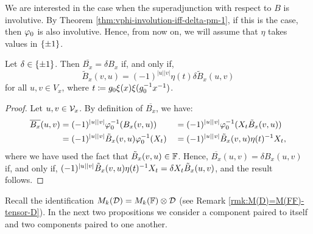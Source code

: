 We are interested in the case when the superadjunction with respect to $B$ is involutive.
By Theorem \ref{thm:vphi-involution-iff-delta-pm-1}, if this is the case, then $\varphi_0$ is also involutive. 
Hence, from now on, we will assume that $\eta$ takes values in $\{ \pm 1 \}$.

\begin{lemma}\label{lemma:B_x-delta}
	Let $\delta \in \{ \pm 1 \}$.
	Then $\overline{B_x} = \delta B_x$ if, and only if,
	\[
		\tilde{B}_x (v, u) = (-1)^{|u| |v|} \eta(t) \delta \tilde{B}_x (u, v)
	\]
	for all $u, v \in V_x$, where $t \coloneqq g_0 \xi(x) \xi(g_0^{-1} x^{-1})$.
\end{lemma}

\begin{proof}
	Let $u,v \in \mathcal V_x$.
	By definition of $\overline{B_x}$, we have:
	\begin{alignat*}{3}
		\overline{B_x} (u, v) & = (-1)^{|u||v|} \varphi_0^{-1}( B_x(v, u) )
		                      &                                                  & = (-1)^{|u||v|} \varphi_0^{-1}( X_t \tilde{B}_x(v, u) ) \\
		                      & = (-1)^{|u||v|} \tilde{B}_x(v, u) \varphi_0^{-1}(X_t)
		                      &                                                  & = (-1)^{|u||v|} \tilde{B}_x(v, u) \eta(t)^{-1} X_t,
	\end{alignat*}
	where we have used the fact that $\tilde B_x (v, u) \in \mathbb{F}$.
	Hence, $\overline{B_x} (u, v) = \delta {B_x} (u, v)$ if, and only if,
	$(-1)^{|u||v|} \tilde{B}_x(v, u) \eta(t)^{-1} X_t = \delta X_t \tilde{B}_x(u, v)$, and the result follows.
\end{proof}

Recall the identification $M_k (\mathcal{D}) = M_k(\mathbb{F}) \otimes \mathcal{D}$ (see Remark \ref{rmk:M(D)=M(FF)-tensor-D}).
In the next two propositions we consider a component paired to itself and two components paired to one another.


